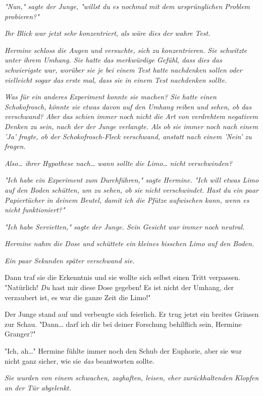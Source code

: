 {\emph{"Nun," sagte der Junge, "willst du es nochmal mit dem ursprünglichen Problem probieren?"}

\emph{Ihr Blick war jetzt sehr konzentriert, als wäre dies der} \emph{\emph{wahre}} \emph{Test.}

\emph{Hermine schloss die Augen und versuchte, sich zu konzentrieren. Sie schwitzte unter ihrem Umhang. Sie hatte das merkwürdige Gefühl, dass dies das schwierigste war, worüber sie je bei einem Test hatte nachdenken sollen oder vielleicht sogar das} \emph{\emph{erste}} \emph{mal, dass sie in einem Test nachdenken sollte.}

\emph{Was für ein anderes Experiment konnte sie machen? Sie hatte einen Schokofrosch, könnte sie etwas davon auf den Umhang reiben und sehen, ob} \emph{\emph{das}} \emph{verschwand? Aber das schien immer noch nicht die Art von verdrehtem negativem Denken zu sein, nach der der Junge verlangte. Als ob sie immer noch nach einem 'Ja' fragte, ob der Schokofrosch-Fleck verschwand, anstatt nach einem 'Nein' zu fragen.}

\emph{Also… ihrer Hypothese nach… wann sollte die Limo…} \emph{\emph{nicht}} \emph{verschwinden?}

\emph{"Ich habe ein Experiment zum Durchführen," sagte Hermine. "Ich will etwas Limo auf den Boden schütten, um zu sehen, ob sie} \emph{\emph{nicht}} \emph{verschwindet. Hast du ein paar Papiertücher in deinem Beutel, damit ich die Pfütze aufwischen kann, wenn es nicht funktioniert?"}

\emph{"Ich habe Servietten," sagte der Junge. Sein Gesicht war immer noch neutral.}

\emph{Hermine nahm die Dose und schüttete ein kleines bisschen Limo auf den Boden.}

\emph{Ein paar Sekunden später verschwand sie.}

Dann traf sie die Erkenntnis und sie wollte sich selbst einen Tritt verpassen. "Natürlich! \emph{Du} hast mir diese Dose gegeben! Es ist nicht der Umhang, der verzaubert ist, es war die ganze Zeit die Limo!"

Der Junge stand auf und verbeugte sich feierlich. Er trug jetzt ein breites Grinsen zur Schau. "Dann… darf ich dir bei deiner Forschung behilflich sein, Hermine Granger?"

"Ich, ah…" Hermine fühlte immer noch den Schub der Euphorie, aber sie war nicht ganz sicher, wie sie \emph{das} beantworten sollte.

\emph{Sie wurden von einem schwachen, zaghaften, leisen, eher} \emph{\emph{zurückhaltenden}} \emph{Klopfen an der Tür abgelenkt.}

}
